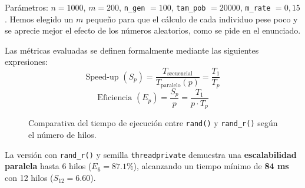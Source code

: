 \documentclass[12pt]{article}
\begin{document}
\begin{enumerate}
Parámetros: $n=1000$, $m=200$, \texttt{n\_gen} $=100$, \texttt{tam\_pob} $=20000$, \texttt{m\_rate} $=0,15$. Hemos 
elegido un $m$ pequeño para que el cálculo de cada individuo 
pese poco y se aprecie mejor el efecto de los números aleatorios, 
como se pide en el enunciado.

Las métricas evaluadas se definen formalmente mediante las siguientes expresiones:
\begin{equation}
    \text{Speed-up } (S_p) = \frac{T_{\text{secuencial}}}{T_{\text{paralelo}}(p)} = \frac{T_1}{T_p}
\end{equation}
\begin{equation}
    \text{Eficiencia } (E_p) = \frac{S_p}{p} = \frac{T_1}{p \cdot T_p}
\end{equation}
\begin{figure}[htbp]
    \centering
    \caption{Comparativa del tiempo de ejecución entre \texttt{rand()} y \texttt{rand\_r()} según el número de hilos.}
    \label{fig:comparativa_rand_vs_rand_r}
\end{figure}
La versión con \texttt{rand\_r()} y semilla
\texttt{threadprivate} demuestra una \textbf{escalabilidad
paralela} hasta 6 hilos ($E_6 = 87.1\%$),
alcanzando un tiempo mínimo de \textbf{84 ms}
con 12 hilos ($S_{12} = 6.60$).
 


\end{enumerate}
\end{document}
